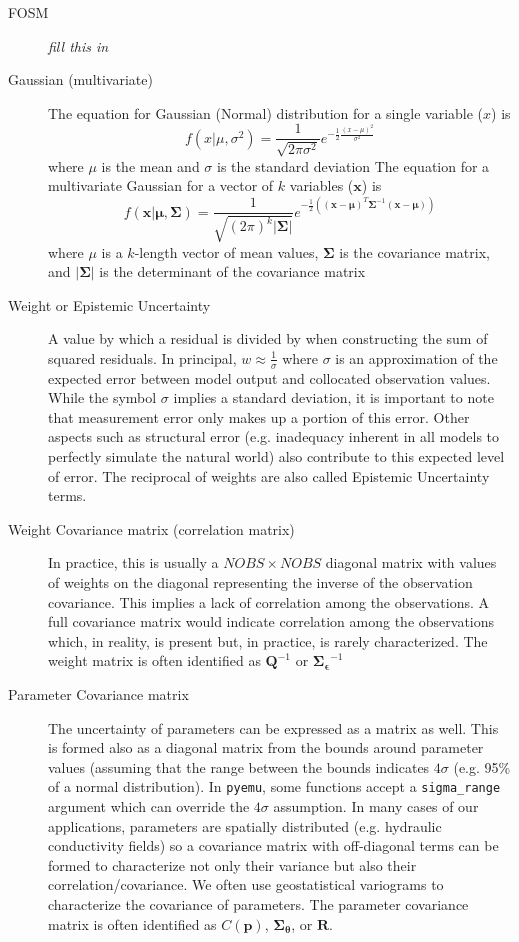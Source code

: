 \documentclass[english]{article}
\begin{document}
\begin{description}
\item [FOSM] \emph{fill this in}
\item [Gaussian (multivariate)] The equation for Gaussian (Normal) distribution for a single variable ($x$) is 
\begin{equation}
f(x|\mu,\sigma^2)=\frac{1}{\sqrt{2\pi\sigma^2}}e^{-\frac{1}{2}\frac{\left(x-\mu\right)^2}{\sigma^2}}
\end{equation}
where $\mu$ is the mean and $\sigma$ is the standard deviation
The equation for a multivariate Gaussian for a vector of $k$ variables ($\mathbf{x}$) is
\begin{equation}
f(\mathbf{x} | \mathbf{\mu},\mathbf{\Sigma})=\frac{1}{\sqrt{(2\pi)^k\left|\mathbf{\Sigma}\right|}}e^{-\frac{1}{2}\left( \left(\mathbf{x}-\mathbf{\mu} \right)^T  \mathbf{\Sigma}^{-1}\left(\mathbf{x}-\mathbf{\mu} \right)\right)}
\end{equation}
where $\mu$ is a $k$-length vector of mean values, $\mathbf{\Sigma}$ is the covariance matrix, and $\left|\mathbf{\Sigma}\right|$ is the determinant of the covariance matrix
\item [Weight or Epistemic Uncertainty] A value by which a residual is divided by when constructing the sum of squared residuals. In principal, $w\approx\frac{1}{\sigma}$ where $\sigma$ is an approximation of the expected error between model output and collocated observation values. While the symbol $\sigma$ implies a standard deviation, it is important to note that measurement error only makes up a portion of this error. Other aspects such as structural error (e.g. inadequacy inherent in all models to perfectly simulate the natural world) also contribute to this expected level of error. The reciprocal of weights are also called Epistemic Uncertainty terms.
\item [Weight Covariance matrix (correlation matrix)] In practice, this is usually a $NOBS\times NOBS$ diagonal matrix with values of weights on the diagonal representing the inverse of the observation covariance. This implies a lack of correlation among the observations. A full covariance matrix would indicate correlation among the observations which, in reality, is present but, in practice, is rarely characterized. The weight matrix is often identified as $\mathbf{Q}^{-1}$ or $\mathbf{\Sigma_\epsilon}^{-1}$
\item [Parameter Covariance matrix] The uncertainty of parameters can be expressed as a matrix as well. This is formed also as a diagonal matrix from the bounds around parameter values (assuming that the range between the bounds indicates $4\sigma$ (e.g. 95\% of a normal distribution). In \texttt{pyemu}, some functions accept a \texttt{sigma\_range} argument which can override the $4\sigma$ assumption. In many cases of our applications, parameters are spatially distributed (e.g. hydraulic conductivity fields) so a covariance matrix with off-diagonal terms can be formed to characterize not only their variance but also their correlation/covariance. We often use geostatistical variograms to characterize the covariance of parameters. The parameter covariance matrix is often identified as $C(\mathbf{p})$, $\mathbf{\Sigma_\theta}$, or $\mathbf{R}$.

\end{description}
\end{document}
